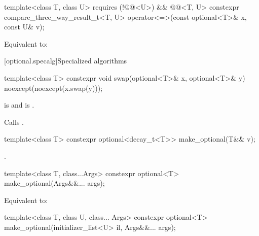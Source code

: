 %
\begin{itemdecl}
template<class T, class U>
    requires (!@@<U>) && @@<T, U>
  constexpr compare_three_way_result_t<T, U>
    operator<=>(const optional<T>& x, const U& v);
\end{itemdecl}

\begin{itemdescr}
\pnum
\effects
Equivalent to: 
\end{itemdescr}

[optional.specalg]{Specialized algorithms}

%
\begin{itemdecl}
template<class T>
  constexpr void swap(optional<T>& x, optional<T>& y) noexcept(noexcept(x.swap(y)));
\end{itemdecl}

\begin{itemdescr}
\pnum
\constraints
{} is  and
 is .

\pnum
\effects
Calls .
\end{itemdescr}

%
\begin{itemdecl}
template<class T> constexpr optional<decay_t<T>> make_optional(T&& v);
\end{itemdecl}

\begin{itemdescr}
\pnum
\returns
{}.
\end{itemdescr}

%
\begin{itemdecl}
template<class T, class...Args>
  constexpr optional<T> make_optional(Args&&... args);
\end{itemdecl}

\begin{itemdescr}
\pnum
\effects
Equivalent to: 
\end{itemdescr}

%
\begin{itemdecl}
template<class T, class U, class... Args>
  constexpr optional<T> make_optional(initializer_list<U> il, Args&&... args);
\end{itemdecl}


